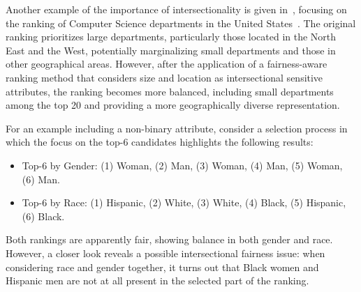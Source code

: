\begin{example}
Another example of the importance of intersectionality is given in~\cite{yang2020causal},
focusing on the ranking of Computer Science departments in the United States~\cite{csranking}. The original ranking prioritizes large departments, particularly those located in the North East and the West, potentially marginalizing small departments and those in other geographical areas. However, after the application of a fairness-aware ranking method
that considers size and location as intersectional sensitive attributes, the ranking becomes more balanced, including small departments among the top 20 and providing a more geographically diverse representation.
\markfull
\end{example}







\begin{example}
For an example including a non-binary attribute, consider a selection process in which the focus on the top-6 candidates highlights the following results:
\begin{itemize}
\item Top-6 by Gender: (1) Woman, (2) Man, (3) Woman, (4) Man, (5) Woman, (6) Man.
\item Top-6 by Race: (1) Hispanic, (2) White, (3) White, (4) Black, (5) Hispanic, (6) Black.
\end{itemize}

Both rankings are apparently fair, showing balance in both gender and race.
However, a closer look reveals a possible intersectional fairness issue: when considering race and gender together, it turns out that Black women and Hispanic men are not at all present in the selected part of the ranking. %
\markfull\end{example}

